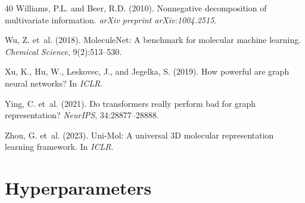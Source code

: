 \documentclass[11pt]{article}
\begin{document}
\begin{thebibliography}{40}
Williams, P.L. and Beer, R.D. (2010).
\newblock Nonnegative decomposition of multivariate information.
\newblock \emph{arXiv preprint arXiv:1004.2515}.

Wu, Z. et~al. (2018).
\newblock MoleculeNet: A benchmark for molecular machine learning.
\newblock \emph{Chemical Science}, 9(2):513--530.

Xu, K., Hu, W., Leskovec, J., and Jegelka, S. (2019).
\newblock How powerful are graph neural networks?
\newblock In \emph{ICLR}.

Ying, C. et~al. (2021).
\newblock Do transformers really perform bad for graph representation?
\newblock \emph{NeurIPS}, 34:28877--28888.

Zhou, G. et~al. (2023).
\newblock Uni-Mol: A universal 3D molecular representation learning framework.
\newblock In \emph{ICLR}.

\end{thebibliography}

\appendix

\section{Hyperparameters}
\label{app:hyperparams}
\end{document}
